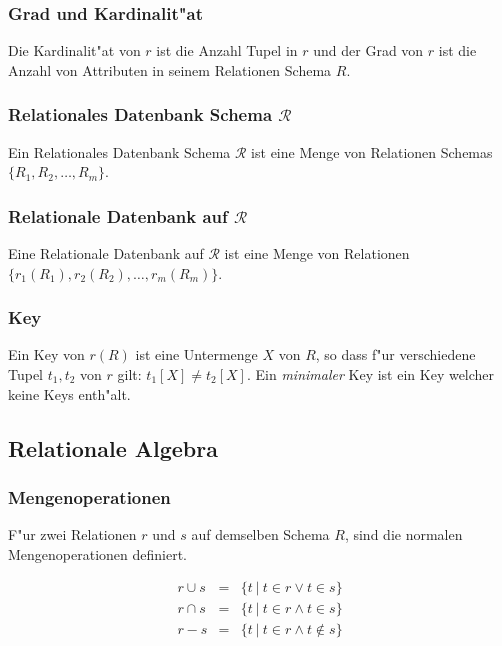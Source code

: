 \documentclass[german, 10pt, a4paper, twocolumn]{scrartcl}
\theoremstyle{definition}
\theoremstyle{remark}
\theoremstyle{example}
\begin{document}
\subsubsection{Grad und Kardinalit"at}

Die Kardinalit"at von $r$ ist die Anzahl Tupel in $r$ und der Grad von $r$ ist die Anzahl von Attributen in seinem Relationen Schema $R$.


\subsubsection{Relationales Datenbank Schema $\mathcal{R}$}

Ein Relationales Datenbank Schema $\mathcal{R}$ ist eine Menge von Relationen Schemas $\{R_1,R_2,\ldots, R_m\}$.


\subsubsection{Relationale Datenbank auf $\mathcal{R}$}

Eine Relationale Datenbank auf $\mathcal{R}$ ist eine Menge von Relationen $\{r_1(R_1),r_2(R_2),\ldots, r_m(R_m)\}$.


\subsubsection{Key}

Ein Key von $r(R)$ ist eine Untermenge $X$ von $R$, so dass f"ur verschiedene Tupel $t_1, t_2$ von $r$ gilt: $t_1[X]\neq t_2[X]$. Ein \textit{minimaler} Key ist ein Key welcher keine Keys enth"alt.


\subsection{Relationale Algebra}

\subsubsection{Mengenoperationen}

F"ur zwei Relationen $r$ und $s$ auf demselben Schema $R$, sind die normalen Mengenoperationen definiert.

\begin{eqnarray*}
	r \cup s &	= &	\{ t \ | \ t \in r \lor t \in s \} \\
	r \cap s &	= &	\{ t \ | \ t \in r \land t \in s \} \\
	r - s &		= &	\{ t \ | \ t \in r \land t \not\in s \}
\end{eqnarray*}
\end{document}
